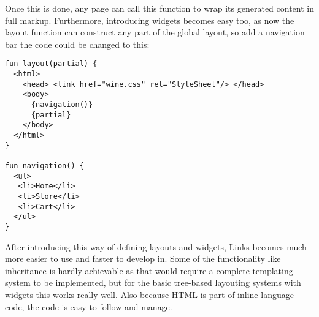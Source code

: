 Once this is done, any page can call this function to wrap its generated content in full markup. Furthermore, introducing widgets becomes easy too, as now the layout function can construct any part of the global layout, so add a navigation bar the code could be changed to this:

\begin{codelisting}
\begin{verbatim}
fun layout(partial) {
  <html> 
    <head> <link href="wine.css" rel="StyleSheet"/> </head>
    <body>
      {navigation()}
      {partial}
    </body>
  </html> 	
}

fun navigation() {
  <ul>
   <li>Home</li>
   <li>Store</li>
   <li>Cart</li>
  </ul>
}
\end{verbatim}
\end{codelisting}

After introducing this way of defining layouts and widgets, Links becomes much more easier to use and faster to develop in. Some of the functionality like inheritance is hardly achievable as that would require a complete templating system to be implemented, but for the basic tree-based layouting systems with widgets this works really well. Also because HTML is part of inline language code, the code is easy to follow and manage.